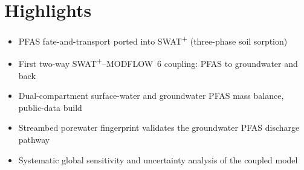 \section*{Highlights}
\begin{itemize}\setlength{\itemsep}{0pt}
  \item PFAS fate-and-transport ported into SWAT\textsuperscript{+} (three-phase soil sorption)
  \item First two-way SWAT\textsuperscript{+}--MODFLOW~6 coupling: PFAS to groundwater and back
  \item Dual-compartment surface-water and groundwater PFAS mass balance, public-data build
  \item Streambed porewater fingerprint validates the groundwater PFAS discharge pathway
  \item Systematic global sensitivity and uncertainty analysis of the coupled model
\end{itemize}
